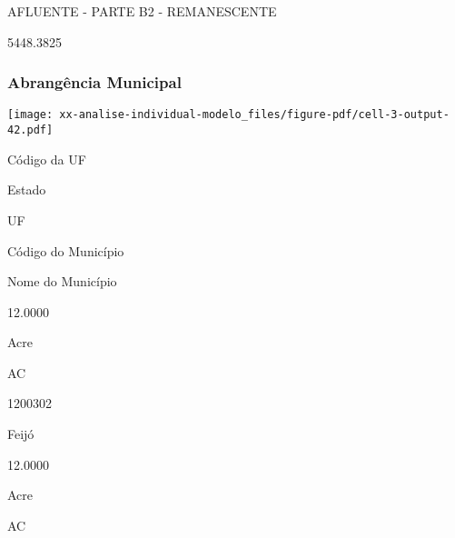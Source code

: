 \documentclass[
  11pt,
  a4paper,
  DIV=11,
  numbers=noendperiod]{scrartcl}
\begin{document}
\n  

\n  

\n    

\n      

AFLUENTE - PARTE B2 - REMANESCENTE

\n      

5448.3825

\n    

\n  

\n

\subsubsection{Abrangência Municipal}\label{abranguxeancia-municipal-2}

\texttt{[image: xx-analise-individual-modelo\_files/figure-pdf/cell-3-output-42.pdf]}

\n  

\n    

\n      

Código da UF

\n      

Estado

\n      

UF

\n      

Código do Município

\n      

Nome do Município

\n    

\n  

\n  

\n    

\n      

12.0000

\n      

Acre

\n      

AC

\n      

1200302

\n      

Feijó

\n    

\n    

\n      

12.0000

\n      

Acre

\n      

AC

\n      
\end{document}
